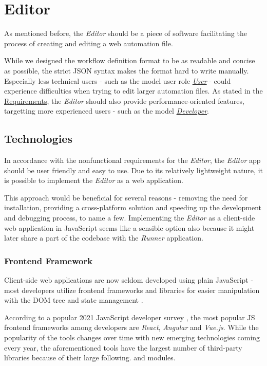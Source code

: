 \section{Editor} \label{sec:editor}

As mentioned before, the \textit{Editor} should be a piece of software facilitating the process of creating and editing a web automation file.

While we designed the workflow definition format to be as readable and concise as possible, the strict JSON syntax makes the format hard to write manually.
Especially less technical users - such as the model user role \hyperref[UserUserRole]{\textit{User}} - could experience difficulties when trying to edit 
larger automation files. 
As stated in the \hyperref[requirements]{Requirements}, the \textit{Editor} should also provide performance-oriented features,
targetting more experienced users - such as the model \hyperref[DevUserRole]{\textit{Developer}}.

\subsection{Technologies}
In accordance with the nonfunctional requirements for the \textit{Editor}, the \textit{Editor} app should be user friendly and easy to use.
Due to its relatively lightweight nature, it is possible to implement the \textit{Editor} as a web application. 

This approach would be beneficial for several reasons - removing the need for installation, providing a cross-platform solution and speeding up the development and debugging process, to name a few.
Implementing the \textit{Editor} as a client-side web application in JavaScript seems like a sensible option also because it might later share a part of the codebase with the \textit{Runner} application.

\subsubsection{Frontend Framework}

Client-side web applications are now seldom developed using plain JavaScript - most developers utilize frontend frameworks and libraries for easier manipulation with the \ac{DOM} tree and state management .

According to a popular 2021 JavaScript developer survey , the most popular \ac{JS} frontend frameworks among developers are \textit{React}, \textit{Angular} and \textit{Vue.js}.
While the popularity of the tools changes over time with new emerging technologies coming every year, the aforementioned tools have the largest number of third-party libraries because of their large following.
and modules.

